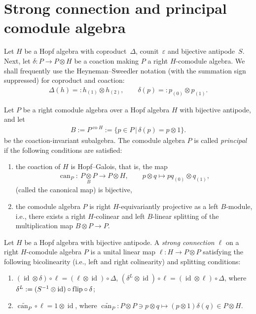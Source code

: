 \section{Strong connection and principal comodule algebra}\label{sc}

Let $H$ be a Hopf algebra with coproduct~$\Delta$, counit~$\varepsilon$ and bijective
antipode~$S$. Next, let \mbox{$\delta\colon P\to P\otimes H$} be a coaction making $P$ a right
\mbox{$H$-comodule} algebra.
We shall frequently use
the Heyneman--Sweedler notation (with the summation sign suppressed) for coproduct and coaction:
\begin{gather*}
\Delta (h)=:h_{(1)}\otimes h_{(2)} ,\qquad
\delta(p)=:p_{(0)}\otimes p_{(1)} .
\end{gather*}
\begin{Definition}
Let $P$ be a right comodule algebra over a Hopf algebra
$H$ with bijective antipode, and let
\begin{gather*}
B:=P^{\operatorname{co}H} := \{ p \in P \, | \, \delta (p) = p \otimes 1 \}.
\end{gather*}
be the coaction-invariant
subalgebra. The comodule algebra $P$
is called {\em principal} if the following conditions are satisf\/ied:
\begin{enumerate}\itemsep=0pt
\item[1)]
the coaction of $H$ is Hopf--Galois, that is, the map
\begin{gather*}
\operatorname{can}_P \colon \  P \underset{B}{\otimes} P \longrightarrow P \otimes H,\qquad
	p \otimes q \longmapsto pq_{(0)} \otimes q_{(1)} ,
\end{gather*}
(called the canonical map) is bijective,
\item[2)]
the comodule algebra $P$ is right
$H$-equivariantly projective as a left  $B$-module, i.e.,
 there exists
 a right $H$-colinear and left $B$-linear
splitting of the multiplication map
$B \otimes P \rightarrow P$.
\end{enumerate}
\end{Definition}

\begin{Definition}[\cite{bh04}]\label{strong}
Let $ H$ be a Hopf algebra with  bijective antipode.
A \emph{strong connection $\ell$} on a right $H$-comodule algebra $P$ is a unital linear map $\ell\colon  H
\rightarrow  P \otimes  P$ satisfying
the following bicolinearity (i.e., left and right colinearity) and splitting conditions:
\begin{enumerate}\itemsep=0pt
\item[1)]
$(\operatorname{id}\otimes \delta) \circ
\ell = (\ell \otimes \operatorname{id}) \circ \Delta$,
$(\delta^L \otimes \operatorname{id}) \circ
\ell = (\operatorname{id} \otimes \ell) \circ
\Delta$, where
$\delta^L :=(S^{-1}\otimes\operatorname{id})\circ\mathrm{f\/lip}\circ\delta$;
\item[2)]
$\widetilde{\operatorname{can}_P} \circ \ell=1 \otimes \operatorname{id}$, where
$\widetilde{\operatorname{can}_P}\colon  P\otimes  P\ni p\otimes q\mapsto (p\otimes 1)\delta(q)\in  P\otimes H$.
\end{enumerate}
\end{Definition}

